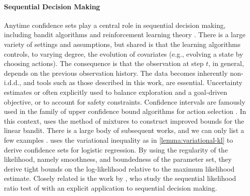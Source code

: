 \paragraph{Sequential Decision Making} Anytime confidence sets play a central role in sequential decision making, including bandit algorithms \citep{lattimore2020bandit} and reinforcement learning theory \citep{agarwal2019reinforcement,foster2023foundations}. There is a large variety of settings and assumptions, but shared is that the learning algorithms controls, to varying degree, the evolution of covariates (e.g., evolving a state by choosing actions). The consequence is that the observation at step $t$, in general, depends on the previous observation history. The data becomes inherently non-i.d.d., and tools such as those described in this work, are essential. Uncertainty estimates or often explicitly used to balance exploration and a goal-driven objective, or to account for safety constraints. Confidence intervals are famously used in the family of upper confidence bound algorithms for action selection \citep{lai1985asymptotically,lai1987adaptive,auer2002finite}. In this context, \citet{abbasi2011improved} uses the method of mixtures to construct improved bounds for the linear bandit. There is a large body of subsequent works, and we can only list a few examples \citep[e.g.,][]{chowdhury2017kernelized,kirschner2018information,Faury2020,Mutny2021a,flynn2024improved,flynn2024tighter}. \citet{lee2024unified} uses the variational inequality as in \cref{lemma:variational-kl} to derive confidence sets for logistic regression. By using the regularity of the likelihood, namely smoothness, and boundedness of the parameter set, they derive tight bounds on the log-likelihood relative to the maximum likelihood estimate. Closely related is the work by \citet{Emm23}, who study the sequential likelihood ratio test of \citet{robbins1970statistical} with an explicit application to sequential decision making.
 


